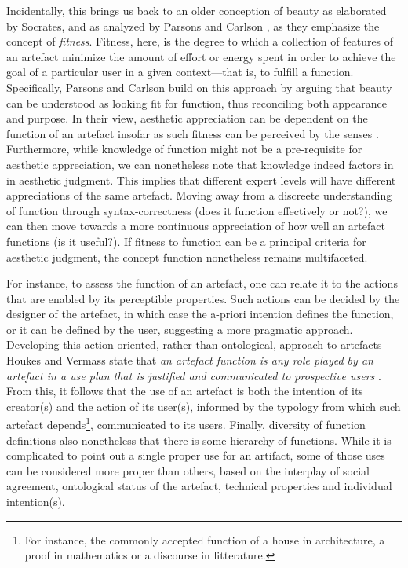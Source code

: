 Incidentally, this brings us back to an older conception of beauty as elaborated by Socrates, and as analyzed by Parsons and Carlson \citep{parsons_functional_2012}, as they emphasize the concept of \emph{fitness}. Fitness, here, is the degree to which a collection of features of an artefact minimize the amount of effort or energy spent in order to achieve the goal of a particular user in a given context—that is, to fulfill a function. Specifically, Parsons and Carlson build on this approach by arguing that beauty can be understood as looking fit for function, thus reconciling both appearance and purpose. In their view, aesthetic appreciation can be dependent on the function of an artefact insofar as such fitness can be perceived by the senses \citep{parsons_functional_2012}. Furthermore, while knowledge of function might not be a pre-requisite for aesthetic appreciation, we can nonetheless note that knowledge indeed factors in in aesthetic judgment. This implies that different expert levels will have different appreciations of the same artefact. Moving away from a discreete understanding of function through syntax-correctness (does it function effectively or not?), we can then move towards a more continuous appreciation of how well an artefact functions (is it useful?). If fitness to function can be a principal criteria for aesthetic judgment, the concept function nonetheless remains multifaceted.

For instance, to assess the function of an artefact, one can relate it to the actions that are enabled by its perceptible properties. Such actions can be decided by the designer of the artefact, in which case the a-priori intention defines the function, or it can be defined by the user, suggesting a more pragmatic approach. Developing this action-oriented, rather than ontological, approach to artefacts Houkes and Vermass state that \emph{an artefact function is any role played by an artefact in a use plan that is justified and communicated to prospective users} \citep{houkes_actions_2004}. From this, it follows that the use of an artefact is both the intention of its creator(s) and the action of its user(s), informed by the typology from which such artefact depends\footnote{For instance, the commonly accepted function of a house in architecture, a proof in mathematics or a discourse in litterature.}, communicated to its users. Finally, diversity of function definitions also nonetheless that there is some hierarchy of functions. While it is complicated to point out a single proper use for an artifact, some of those uses can be considered more proper than others, based on the interplay of social agreement, ontological status of the artefact, technical properties and individual intention(s).

